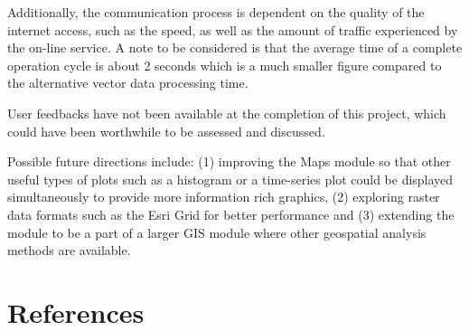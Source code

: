 \documentclass[a4paper, 12pt]{article}
\begin{document}
Additionally, the communication process is dependent on the quality of the internet access, such as the speed, as well as the amount of traffic experienced by the on-line service. A note to be considered is that the average time of a complete operation cycle is about 2 seconds which is a much smaller figure compared to the alternative vector data processing time.

User feedbacks have not been available at the completion of this project, which could have been worthwhile to be assessed and discussed.

Possible future directions include: (1) improving the Maps module so that other useful types of plots such as a histogram or a time-series plot could be displayed simultaneously to provide more information rich graphics, (2) exploring raster data formats such as the Esri Grid for better performance and (3) extending the module to be a part of a larger GIS module where other geospatial analysis methods are available.

\section{References}
\renewcommand{\section}[2]{}%


\end{document}
